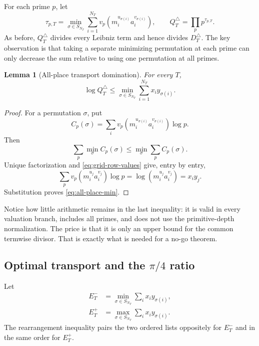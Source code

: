 \documentclass[11pt,oneside]{article}
\newtheorem{lemma}[theorem]{Lemma}
\theoremstyle{definition}
\theoremstyle{remark}
\begin{document}
For each prime $p$, let
\begin{equation}\label{eq:grid-tau}
 \tau_{p,T}
 =\min_{\sigma\in S_{N_T}}
   \sum_{i=1}^{N_T}
   v_p\!\left(m_i^{u_{\sigma(i)}}a_i^{v_{\sigma(i)}}\right),
 \qquad
 Q_T^{\triangle}=\prod_p p^{\tau_{p,T}}.
\end{equation}
As before, $Q_T^{\triangle}$ divides every Leibniz term and hence divides
$D_T^{\triangle}$.  The key observation is that taking a separate minimizing permutation at
each prime can only decrease the sum relative to using one permutation at all primes.

\begin{lemma}[All-place transport domination]\label{lem:all-place-transport}
For every $T$,
\begin{equation}\label{eq:all-place-min}
 \log Q_T^{\triangle}
 \le
 \min_{\sigma\in S_{N_T}}
 \sum_{i=1}^{N_T}x_i y_{\sigma(i)}.
\end{equation}
\end{lemma}

\begin{proof}
For a permutation $\sigma$, put
\[
 C_p(\sigma)=
 \sum_i v_p\!\left(m_i^{u_{\sigma(i)}}a_i^{v_{\sigma(i)}}\right)\log p.
\]
Then
\[
 \sum_p\min_\sigma C_p(\sigma)
 \le \min_\sigma\sum_p C_p(\sigma).
\]
Unique factorization and \eqref{eq:grid-row-values} give, entry by entry,
\[
 \sum_p v_p(m_i^{u_j}a_i^{v_j})\log p
 =\log(m_i^{u_j}a_i^{v_j})
 =x_i y_j.
\]
Substitution proves \eqref{eq:all-place-min}.
\end{proof}

Notice how little arithmetic remains in the last inequality: it is valid in every valuation
branch, includes all primes, and does not use the primitive-depth normalization.  The price is
that it is only an upper bound for the common termwise divisor.  That is exactly what is needed
for a no-go theorem.

\subsection{Optimal transport and the \texorpdfstring{$\pi/4$}{pi/4} ratio}

Let
\begin{align}
 E_T^-&=\min_{\sigma\in S_{N_T}}\sum_i x_i y_{\sigma(i)},
 \label{eq:grid-Eminus}\\
 E_T^+&=\max_{\sigma\in S_{N_T}}\sum_i x_i y_{\sigma(i)}.
 \label{eq:grid-Eplus}
\end{align}
The rearrangement inequality pairs the two ordered lists oppositely for $E_T^-$ and in the
same order for $E_T^+$.
\end{document}
